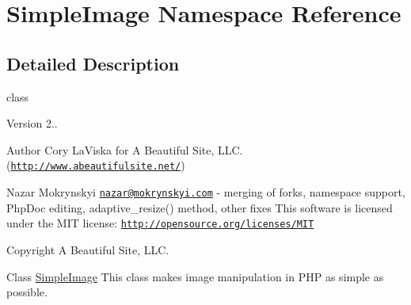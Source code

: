\hypertarget{namespace_simple_image}{\section{Simple\-Image Namespace Reference}
\label{namespace_simple_image}
}


\subsection{Detailed Description}
class \begin{DoxyVersion}{Version}
2.. 
\end{DoxyVersion}
\begin{DoxyAuthor}{Author}
Cory La\-Viska for A Beautiful Site, L\-L\-C. (\href{http://www.abeautifulsite.net/}{\tt http\-://www.\-abeautifulsite.\-net/}) 

Nazar Mokrynskyi \href{mailto:nazar@mokrynskyi.com}{\tt nazar@mokrynskyi.\-com} -\/ merging of forks, namespace support, Php\-Doc editing, adaptive\-\_\-resize() method, other fixes  This software is licensed under the M\-I\-T license\-: \href{http://opensource.org/licenses/MIT}{\tt http\-://opensource.\-org/licenses/\-M\-I\-T} 
\end{DoxyAuthor}
\begin{DoxyCopyright}{Copyright}
A Beautiful Site, L\-L\-C.
\end{DoxyCopyright}
Class \hyperlink{namespace_simple_image}{Simple\-Image} This class makes image manipulation in P\-H\-P as simple as possible. 